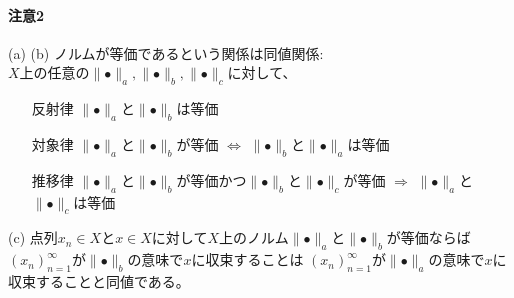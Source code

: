 \documentclass[12pt,a4paper]{article}
\begin{document}
      \paragraph{注意2}
        (a) (b) ノルムが等価であるという関係は同値関係: \\
        $X$上の任意の$\parallel\bullet\parallel_a, \parallel\bullet\parallel_b, \parallel\bullet\parallel_c$に対して、
        \begin{itemize}
          \item[反射律] $\parallel\bullet\parallel_a$と$\parallel\bullet\parallel_b$は等価
          \item[対象律] $\parallel\bullet\parallel_a$と$\parallel\bullet\parallel_b$が等価 $\Leftrightarrow$ $\parallel\bullet\parallel_b$と$\parallel\bullet\parallel_a$は等価
          \item[推移律] $\parallel\bullet\parallel_a$と$\parallel\bullet\parallel_b$が等価かつ$\parallel\bullet\parallel_b$と$\parallel\bullet\parallel_c$が等価 $\Rightarrow$ $\parallel\bullet\parallel_a$と$\parallel\bullet\parallel_c$は等価
        \end{itemize}
        (c) 点列$x_n \in X$と$x \in X$に対して$X$上のノルム$\parallel\bullet\parallel_a$と$\parallel\bullet\parallel_b$が等価ならば\\
        ${(x_n)}_{n=1}^\infty$が$\parallel\bullet\parallel_b$の意味で$x$に収束することは
        ${(x_n)}_{n=1}^\infty$が$\parallel\bullet\parallel_a$の意味で$x$に収束することと同値である。
\end{document}
